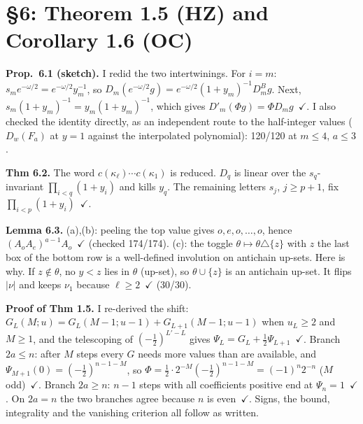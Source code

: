 \documentclass[11pt]{article}
\begin{document}
\section{\S6: Theorem 1.5 (HZ) and Corollary 1.6 (OC)}

\textbf{Prop.~6.1 (sketch).} I redid the two intertwinings. For $i=m$:
$s_m e^{-\omega/2}=e^{-\omega/2}y_m^{-1}$, so
$D_m(e^{-\omega/2}g)=e^{-\omega/2}(1+y_m)^{-1}D^B_mg$. Next,
$s_m(1+y_m)^{-1}=y_m(1+y_m)^{-1}$, which gives $D'_m(\Phi g)=\Phi D_mg$~$\checkmark$. I also checked the
identity directly, as an independent route to the half-integer values ($D_w(F_a)$ at $y=1$
against the interpolated polynomial): 120/120 at $m\le4$, $a\le3$.

\textbf{Thm 6.2.} The word $c(\kappa_\ell)\cdots c(\kappa_1)$ is reduced. $D_q$ is linear over the
$s_q$-invariant $\prod_{i<q}(1+y_i)$ and kills $y_q$. The remaining letters $s_j$, $j\ge p+1$, fix
$\prod_{i<p}(1+y_i)$~$\checkmark$.

\textbf{Lemma 6.3.} (a),(b): peeling the top value gives $o,e,o,\dots,o$, hence
$(A_oA_e)^{a-1}A_o$~$\checkmark$ (checked 174/174). (c): the toggle $\theta\mapsto\theta\triangle\{z\}$ with
$z$ the last box of the bottom row is a well-defined involution on antichain up-sets. Here is why.
If $z\notin\theta$, no $y<z$ lies in $\theta$ (up-set), so $\theta\cup\{z\}$ is an antichain up-set.
It flips $|\nu|$ and keeps $\nu_1$ because $\ell\ge2$~$\checkmark$ (30/30).

\textbf{Proof of Thm 1.5.} I re-derived the shift: $G_L(M;u)=G_L(M-1;u-1)+G_{L+1}(M-1;u-1)$ when
$u_L\ge2$ and $M\ge1$, and the telescoping of $(-\tfrac12)^{L'-L}$ gives
$\Psi_L=G_L+\tfrac12\Psi_{L+1}$~$\checkmark$. Branch $2a\le n$: after $M$ steps every $G$ needs more values
than are available, and $\Psi_{M+1}(0)=(-\tfrac12)^{n-1-M}$, so
$\Phi=\tfrac12\cdot2^{-M}(-\tfrac12)^{n-1-M}=(-1)^n2^{-n}$ ($M$ odd)~$\checkmark$. Branch $2a\ge n$: $n-1$
steps with all coefficients positive end at $\Psi_n=1$~$\checkmark$. On $2a=n$ the two branches agree because
$n$ is even~$\checkmark$. Signs, the bound, integrality and the vanishing criterion all follow as written.
\end{document}
